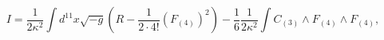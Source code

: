 \begin{equation}
\label{11Dact}
I = \frac{1}{2\kappa^2} \int d^{11} x \sqrt{-g} \left(
R - \frac{1}{2 \cdot 4!} (F_{(4)})^2 \right)
- \frac{1}{6} \frac{1}{2\kappa^2} \int C_{(3)} \wedge F_{(4)} \wedge F_{(4)},
\end{equation}

